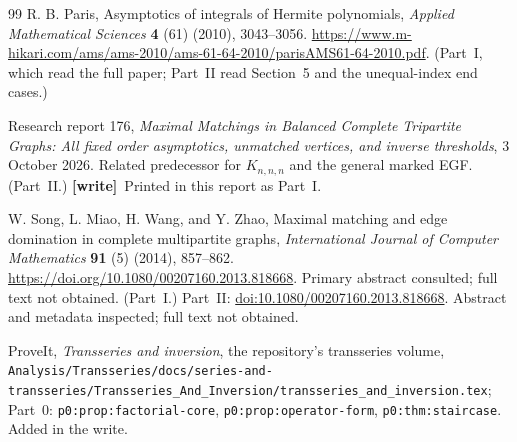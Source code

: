 \documentclass[11pt,letterpaper]{article}
\theoremstyle{remark}\newtheorem{remark}[theorem]{Remark}
\newcommand{\file}[1]{\nolinkurl{#1}}
\newcommand{\wtag}{\textup{\textbf{[write]}}}
\begin{document}
\begin{thebibliography}{99}
R. B. Paris, Asymptotics of integrals of Hermite polynomials,
\emph{Applied Mathematical Sciences} \textbf{4} (61) (2010), 3043--3056.
\url{https://www.m-hikari.com/ams/ams-2010/ams-61-64-2010/parisAMS61-64-2010.pdf}. (Part~I, which read the full paper; Part~II read Section~5 and the unequal-index end cases.)

 Research report 176, \emph{Maximal Matchings in Balanced Complete Tripartite Graphs: All fixed order asymptotics, unmatched vertices, and inverse thresholds}, 3 October 2026. Related predecessor for $K_{n,n,n}$ and the general marked EGF. (Part~II.) \wtag\ Printed in this report as Part~I.

W. Song, L. Miao, H. Wang, and Y. Zhao, Maximal matching and edge domination in complete multipartite graphs,
\emph{International Journal of Computer Mathematics} \textbf{91} (5) (2014), 857--862.
\url{https://doi.org/10.1080/00207160.2013.818668}.
Primary abstract consulted; full text not obtained. (Part~I.)
Part~II: \href{https://doi.org/10.1080/00207160.2013.818668}{doi:10.1080/00207160.2013.818668}. Abstract and metadata inspected; full text not obtained.

ProveIt, \emph{Transseries and inversion}, the repository's transseries volume,
\file{Analysis/Transseries/docs/series-and-transseries/Transseries_And_Inversion/transseries_and_inversion.tex};
Part~0: \file{p0:prop:factorial-core}, \file{p0:prop:operator-form}, \file{p0:thm:staircase}. Added in the write.
\end{thebibliography}
\end{document}
